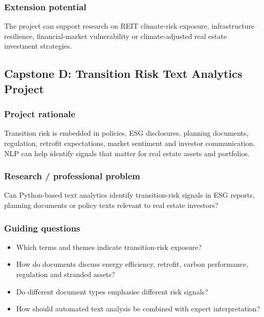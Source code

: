 \documentclass[
  a4paper,
]{article}
\providecommand{\tightlist}{%
  \setlength{\itemsep}{0pt}\setlength{\parskip}{0pt}}
\begin{document}
\subsubsection{Extension potential}\label{extension-potential-2}

The project can support research on REIT climate-risk exposure,
infrastructure resilience, financial-market vulnerability or
climate-adjusted real estate investment strategies.

\subsection{Capstone D: Transition Risk Text Analytics
Project}\label{capstone-d-transition-risk-text-analytics-project}

\subsubsection{Project rationale}\label{project-rationale-3}

Transition risk is embedded in policies, ESG disclosures, planning
documents, regulation, retrofit expectations, market sentiment and
investor communication. NLP can help identify signals that matter for
real estate assets and portfolios.

\subsubsection{Research / professional
problem}\label{research-professional-problem-3}

Can Python-based text analytics identify transition-risk signals in ESG
reports, planning documents or policy texts relevant to real estate
investors?

\subsubsection{Guiding questions}\label{guiding-questions-3}

\begin{itemize}
\tightlist
\item
  Which terms and themes indicate transition-risk exposure?
\item
  How do documents discuss energy efficiency, retrofit, carbon
  performance, regulation and stranded assets?
\item
  Do different document types emphasise different risk signals?
\item
  How should automated text analysis be combined with expert
  interpretation?
\end{itemize}
\end{document}
